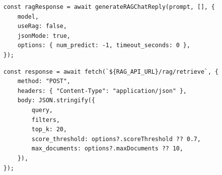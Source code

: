 \begin{lstlisting}[frame=single, breaklines=true, caption={Chiamata TypeScript per generazione bozza senza retrieval.}, label={lst:draft_generation_call}]
const ragResponse = await generateRAGChatReply(prompt, [], {
    model,
    useRag: false,
    jsonMode: true,
    options: { num_predict: -1, timeout_seconds: 0 },
});
\end{lstlisting}

\begin{lstlisting}[frame=single, breaklines=true, caption={Chiamata TypeScript al retrieval RAG.}, label={lst:typescript_search_rag}]
const response = await fetch(`${RAG_API_URL}/rag/retrieve`, {
    method: "POST",
    headers: { "Content-Type": "application/json" },
    body: JSON.stringify({
        query,
        filters,
        top_k: 20,
        score_threshold: options?.scoreThreshold ?? 0.7,
        max_documents: options?.maxDocuments ?? 10,
    }),
});
\end{lstlisting}
